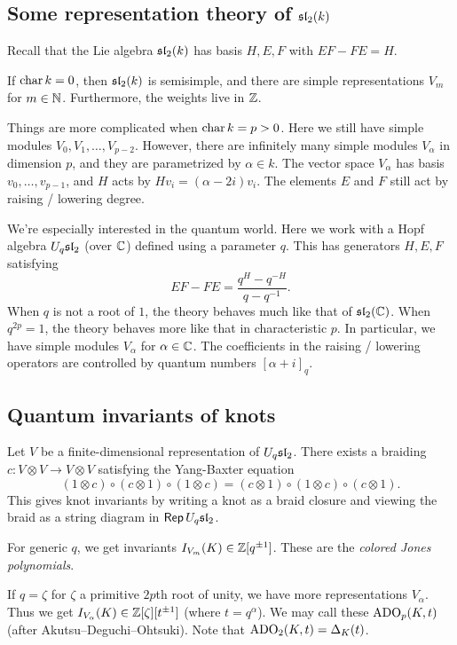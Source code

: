 \documentclass{amsart}
\begin{document}
\subsection{Some representation theory of $\sl_2(k)$}

Recall that the Lie algebra $\sl_2(k)$ has basis $H, E, F$ with $EF - FE = H$.

If $\charop k = 0$, then $\sl_2(k)$ is semisimple, and there are simple representations $V_m$ for $m \in \NN$.
Furthermore, the weights live in $\ZZ$.

Things are more complicated when $\charop k = p > 0$.
Here we still have simple modules $V_0, V_1, \dots, V_{p-2}$.
However, there are infinitely many simple modules $V_\alpha$ in dimension $p$, and they are parametrized by $\alpha \in k$.
The vector space $V_\alpha$ has basis $v_0, \dots, v_{p-1}$, and $H$ acts by $H v_i = (\alpha - 2i) v_i$.
The elements $E$ and $F$ still act by raising / lowering degree.

We're especially interested in the quantum world.
Here we work with a Hopf algebra $U_q \sl_2$ (over $\CC$) defined using a parameter $q$.
This has generators $H, E, F$ satisfying
\[
  EF - FE = \frac{q^H - q^{-H}}{q - q^{-1}}.
\]
When $q$ is not a root of $1$, the theory behaves much like that of $\sl_2(\CC)$.
When $q^{2p} = 1$, the theory behaves more like that in characteristic $p$.
In particular, we have simple modules $V_\alpha$ for $\alpha \in \CC$.
The coefficients in the raising / lowering operators are controlled by quantum numbers $[\alpha + i]_q$.

\subsection{Quantum invariants of knots}

Let $V$ be a finite-dimensional representation of $U_q \sl_2$.
There exists a braiding $c: V \otimes V \to V \otimes V$ satisfying the Yang-Baxter equation
\[
  (1 \otimes c) \circ (c \otimes 1) \circ (1 \otimes c) = (c \otimes 1) \circ (1 \otimes c) \circ (c \otimes 1).
\]
This gives knot invariants by writing a knot as a braid closure and viewing the braid as a string diagram in $\Rep U_q \sl_2$.

For generic $q$, we get invariants $I_{V_m}(K) \in \ZZ[q^{\pm 1}]$.
These are the \emph{colored Jones polynomials}.

If $q = \zeta$ for $\zeta$ a primitive $2p$th root of unity, we have more representations $V_\alpha$.
Thus we get $I_{V_\alpha}(K) \in \ZZ[\zeta][t^{\pm 1}]$ (where $t = q^\alpha$).
We may call these $\ADO_p(K, t)$ (after Akutsu--Deguchi--Ohtsuki).
Note that $\ADO_2(K, t) = \Delta_K(t)$.
\end{document}
